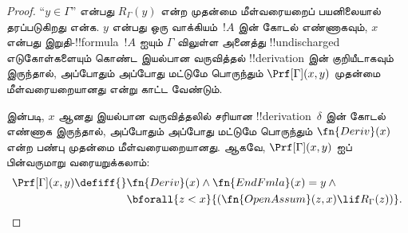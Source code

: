\documentclass[../../../include/open-logic-section]{subfiles}
\begin{document}
\begin{proof}
  “$y \in \Gamma$” என்பது $R_\Gamma(y)$ என்ற முதன்மை மீள்வரையறைப்
  பயனிலையால் தரப்படுகிறது என்க. $y$ என்பது ஒரு வாக்கியம்~$!A$ இன்
  கோடல் எண்ணாகவும், $x$ என்பது இறுதி-!!{formula}~$!A$ ஐயும்
  $\Gamma$ விலுள்ள அனைத்து !!{undischarged} எடுகோள்களையும் கொண்ட இயல்பான
  வருவித்தல் !!{derivation} இன் குறியீடாகவும் இருந்தால், அப்போதும் அப்போது
  மட்டுமே பொருந்தும் $\Prf[\Gamma](x, y)$ முதன்மை மீள்வரையறையானது என்று
  காட்ட வேண்டும்.

   இன்படி, $x$ ஆனது இயல்பான வருவித்தலில் சரியான
  !!{derivation}~$\delta$ இன் கோடல் எண்ணாக இருந்தால், அப்போதும் அப்போது
  மட்டுமே பொருந்தும் $\fn{Deriv}(x)$ என்ற பண்பு முதன்மை
  மீள்வரையறையானது. ஆகவே, $\Prf[\Gamma](x, y)$ ஐப் பின்வருமாறு
  வரையறுக்கலாம்:
  \begin{align*}
    \Prf[\Gamma](x, y) \defiff {}
    & \fn{Deriv}(x) \land \fn{EndFmla}(x) = y \land {} \\
    & \bforall{z < x}{(\fn{OpenAssum}(z, x) \lif R_\Gamma(z))}.
  \end{align*}
\end{proof}
\end{document}
